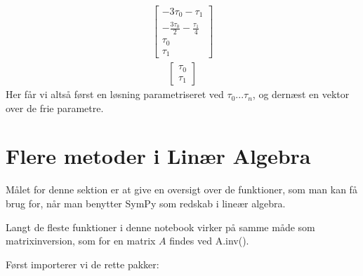 \documentclass[letterpaper,10pt,english]{jupyterBook}
\begin{document}
\begin{sphinxVerbatim}[commandchars=\\\{\}]
  \PYG{p}{[}  \PYG{p}{]}
\PYG{p}{[}\PYG{p}{]}
        \PYG{p}{[}\PYG{p}{]}
\end{sphinxVerbatim}
\begin{equation*}
\begin{split}\displaystyle \left[\begin{matrix}- 3 \tau_{0} - \tau_{1}\\- \frac{3 \tau_{0}}{2} - \frac{\tau_{1}}{4}\\\tau_{0}\\\tau_{1}\end{matrix}\right]\end{split}
\end{equation*}\begin{equation*}
\begin{split}\displaystyle \left[\begin{matrix}\tau_{0}\\\tau_{1}\end{matrix}\right]\end{split}
\end{equation*}
Her får vi altså først en løsning parametriseret ved \(\tau_0 ... \tau_n\), og dernæst en vektor over de frie parametre.


\section{Flere metoder i Linær Algebra}
\label{\detokenize{notebooks/sympy/Notebook_LinAlg_2:flere-metoder-i-linaer-algebra}}\label{\detokenize{notebooks/sympy/Notebook_LinAlg_2::doc}}
Målet for denne sektion er at give en oversigt over de funktioner, som man kan få brug for, når man benytter SymPy som redskab i lineær algebra.

Langt de fleste funktioner i denne notebook virker på samme måde som matrixinversion, som for en matrix \(A\) findes ved A.inv().

Først importerer vi de rette pakker:

\begin{sphinxVerbatim}[commandchars=\\\{\}]
                 
           
\end{sphinxVerbatim}
\end{document}
